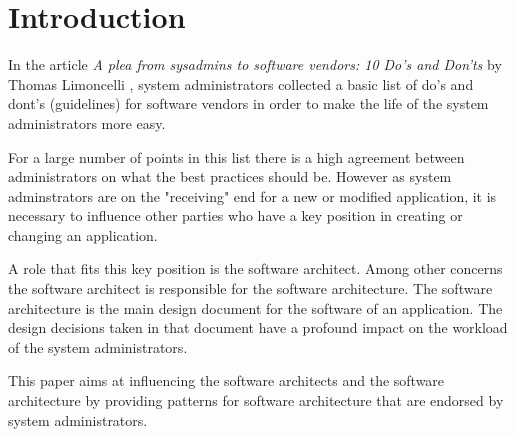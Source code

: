 \section{Introduction} 

In the article \textit{A plea from sysadmins to software vendors: 10 Do's and Don'ts} by Thomas Limoncelli \cite{Limoncelli2011a}, system administrators collected a basic list of do's and dont's (guidelines) for software vendors in order to make the life of the system administrators more easy. 

For a large number of points in this list there is a high agreement between administrators on what the best practices should be. However as system adminstrators are on the "receiving" end for a new or modified application, it is necessary to influence other parties who have a key position in creating or changing an application. 

A role that fits this key position is the software architect. Among other concerns the software architect is responsible for the software architecture. The software architecture is the main design document for the software of an application. The design decisions taken in that document have a profound impact on the workload of the system administrators. 

This paper aims at influencing the software architects and the software architecture by providing patterns for software architecture that are endorsed by system administrators.

